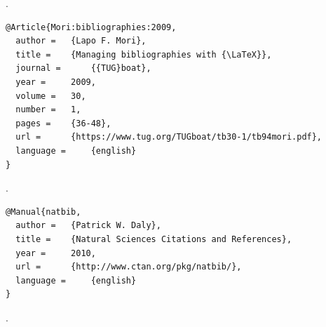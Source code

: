 \begin{framed}
  \noindent {}.
\end{framed}

\begin{lstlisting}
@Article{Mori:bibliographies:2009,
  author = 	 {Lapo F. Mori},
  title = 	 {Managing bibliographies with {\LaTeX}},
  journal = 	 {{TUG}boat},
  year = 	 2009,
  volume = 	 30,
  number = 	 1,
  pages = 	 {36-48},
  url =		 {https://www.tug.org/TUGboat/tb30-1/tb94mori.pdf},
  language = 	 {english}
}
\end{lstlisting}

\begin{framed}
\noindent {}.
\end{framed}

\begin{lstlisting}
@Manual{natbib,
  author = 	 {Patrick W. Daly},
  title = 	 {Natural Sciences Citations and References},
  year = 	 2010,
  url = 	 {http://www.ctan.org/pkg/natbib/},
  language = 	 {english}
}
\end{lstlisting}

\begin{framed}
\noindent {}.
\end{framed}

